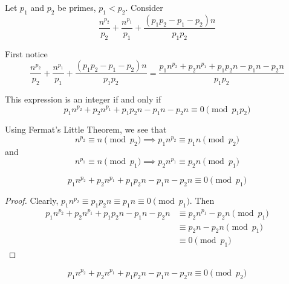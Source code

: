 
Let $p_1$ and $p_2$ be primes, $p_1 < p_2$. Consider
\[ \frac{n^{p_2}}{p_2} + \frac{n^{p_1}}{p_1} + \frac{(p_1 p_2 - p_1 - p_2)n}{p_1 p_2} \]

    First notice
    \[ \frac{n^{p_2}}{p_2} + \frac{n^{p_1}}{p_1} + \frac{(p_1 p_2 - p_1 -
    p_2)n}{p_1 p_2} 
    = 
    \frac
    {p_1 n^{p_2} + p_2 n^{p_1} + p_1 p_2 n - p_1 n - p_2 n}
    {p_1 p_2}
    \]
    
    This expression is an integer if and only if 
    \[p_1 n^{p_2} + p_2 n^{p_1} + p_1 p_2 n - p_1 n - p_2 n \equiv 0 \pmod{p_1 p_2} \]
    
    Using Fermat's Little Theorem, we see that
    \[ n^{p_2} \equiv n \pmod{p_2} \implies  p_1 n^{p_2} \equiv p_1 n  \pmod{p_2} \]
    and 
    \[ n^{p_1} \equiv n \pmod{p_1} \implies  p_2 n^{p_1} \equiv p_2 n \pmod{p_1} \]

\begin{claim}
    \[p_1 n^{p_2} + p_2 n^{p_1} + p_1 p_2 n - p_1 n - p_2 n \equiv 0 \pmod{p_1} \]
\end{claim}
\begin{proof}
    Clearly, $p_1 n^{p_2} \equiv p_1 p_2 n \equiv p_1 n \equiv0 \pmod{p_1}$.
    Then
    \begin{align*}
    p_1 n^{p_2} + p_2 n^{p_1} + p_1 p_2 n - p_1 n - p_2 n
    &\equiv p_2 n^{p_1} - p_2 n \pmod{p_1}\\
    &\equiv p_2 n - p_2 n \pmod{p_1}\\
    &\equiv 0 \pmod{p_1}
    \end{align*}
\end{proof}

\begin{claim}
    \[p_1 n^{p_2} + p_2 n^{p_1} + p_1 p_2 n - p_1 n - p_2 n \equiv 0 \pmod{p_2} \]
\end{claim}
\
